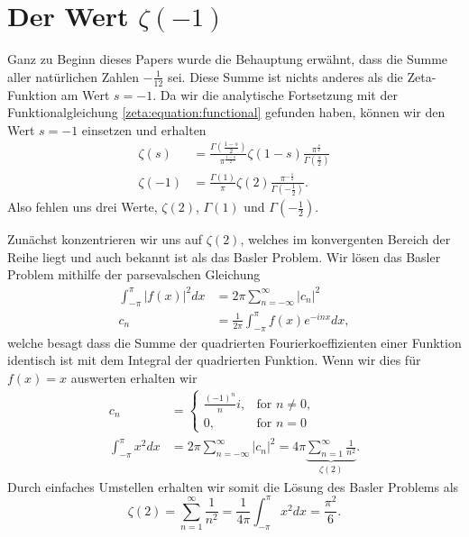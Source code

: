 \section{Der Wert $\zeta(-1)$} \label{zeta:section:fazit}
%

Ganz zu Beginn dieses Papers wurde die Behauptung erwähnt, dass die Summe aller natürlichen Zahlen $-\frac{1}{12}$ sei.
Diese Summe ist nichts anderes als die Zeta-Funktion am Wert $s=-1$.
Da wir die analytische Fortsetzung mit der Funktionalgleichung \eqref{zeta:equation:functional} gefunden haben, können wir den Wert $s=-1$ einsetzen und erhalten
\begin{align*}
    \zeta(s)
    &=
    \frac{\Gamma ( \frac{1-s}{2} )}{\pi^{\frac{1-s}{2}}}
    \zeta(1-s)
    \frac{\pi^{\frac{s}{2}}}{\Gamma ( \frac{s}{2} )}
    \\
    \zeta(-1)
    &=
    \frac{\Gamma(1)}{\pi}
    \zeta(2)
    \frac{\pi^{-\frac{1}{2}}}{\Gamma ( -\frac{1}{2} )}.
\end{align*}
Also fehlen uns drei Werte, $\zeta(2)$, $\Gamma(1)$ und $\Gamma(-\frac{1}{2})$.

Zunächst konzentrieren wir uns auf $\zeta(2)$, welches im konvergenten Bereich der Reihe liegt und auch bekannt ist als das Basler Problem.
%
Wir lösen das Basler Problem \cite{zeta:online:basel} mithilfe der parsevalschen Gleichung \cite{zeta:online:pars}
%
\begin{align}
    \int_{-\pi}^{\pi} |f(x)|^2 dx
    &=
    2\pi \sum_{n=-\infty}^{\infty} |c_n|^2 \\
    c_n
    &=
    \frac{1}{2\pi}
    \int_{-\pi}^{\pi}f(x)e^{-inx} dx,
\end{align}
welche besagt dass die Summe der quadrierten Fourierkoeffizienten einer Funktion identisch ist mit dem Integral der quadrierten Funktion.
Wenn wir dies für $f(x) = x$ auswerten erhalten wir
\begin{align}
    c_n
    &=
    \begin{cases}
        \frac{(-1)^n}{n} i, & \text{for } n\neq0, \\
        0, & \text{for } n=0
    \end{cases}
    \\
    \int_{-\pi}^{\pi} x^2 dx
    &=
    2\pi \sum_{n=-\infty}^{\infty} |c_n|^2
    =
    4\pi \underbrace{\sum_{n=1}^{\infty} \frac{1}{n^2}}_{\displaystyle{\zeta(2)}}.
\end{align}
Durch einfaches Umstellen erhalten wir somit die Lösung des Basler Problems als
\begin{equation}
    \zeta(2) = \sum_{n=1}^{\infty} \frac{1}{n^2} = \frac{1}{4\pi}
    \int_{-\pi}^{\pi} x^2 dx
    = \frac{\pi^2}{6}.
\end{equation}

